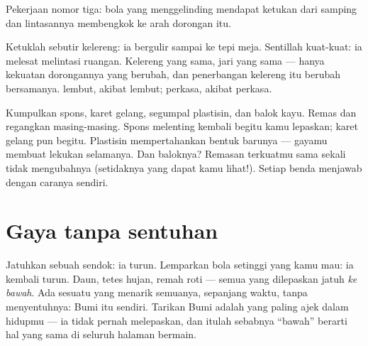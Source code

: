 \begin{omfigure}

{\small Pekerjaan nomor tiga: bola yang menggelinding mendapat ketukan
dari samping dan lintasannya membengkok ke arah dorongan itu.}
\end{omfigure}

\begin{example}\label{ex:g2:pushes-and-pulls:stronger}
Ketuklah sebutir kelereng: ia bergulir sampai ke tepi meja. Sentillah
kuat-kuat: ia melesat melintasi ruangan. Kelereng yang sama, jari yang
sama --- hanya kekuatan dorongannya yang berubah, dan penerbangan
kelereng itu berubah bersamanya.  lembut, akibat lembut; 
perkasa, akibat perkasa.
\end{example}

\begin{example}\label{ex:g2:pushes-and-pulls:shape}
Kumpulkan spons, karet gelang, segumpal plastisin, dan balok kayu.
Remas dan regangkan masing-masing. Spons melenting kembali begitu kamu
lepaskan; karet gelang pun begitu. Plastisin mempertahankan bentuk
barunya --- gayamu membuat lekukan selamanya. Dan baloknya? Remasan
terkuatmu sama sekali tidak mengubahnya (setidaknya yang dapat kamu
lihat!). Setiap benda menjawab  dengan caranya sendiri.
\end{example}

\section{Gaya tanpa sentuhan}

\begin{example}\label{ex:g2:pushes-and-pulls:earthpull}
Jatuhkan sebuah sendok: ia turun. Lemparkan bola setinggi yang kamu
mau: ia kembali turun. Daun, tetes hujan, remah roti --- semua yang
dilepaskan jatuh \emph{ke bawah}. Ada sesuatu yang menarik semuanya,
sepanjang waktu, tanpa menyentuhnya: Bumi itu sendiri. Tarikan Bumi
adalah  yang paling ajek dalam hidupmu --- ia tidak pernah
melepaskan, dan itulah sebabnya ``bawah'' berarti hal yang sama di
seluruh halaman bermain.
\end{example}


